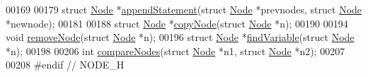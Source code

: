 \begin{DoxyCode}
00169 
00179 \textcolor{keyword}{struct }\hyperlink{structNode}{Node} *\hyperlink{node_8c_a36f4e62840cea8119a80005c7093c1a2}{appendStatement}(\textcolor{keyword}{struct} \hyperlink{structNode}{Node} *prevnodes, \textcolor{keyword}{struct} 
      \hyperlink{structNode}{Node} *newnode);
00181 
00188 \textcolor{keyword}{struct }\hyperlink{structNode}{Node} *\hyperlink{node_8c_a630e9a32f8dad634171441534eedd274}{copyNode}(\textcolor{keyword}{struct} \hyperlink{structNode}{Node} *n);
00190 
00194 \textcolor{keywordtype}{void} \hyperlink{node_8c_a9404ea17c515d0d18c37bde7c31b5979}{removeNode}(\textcolor{keyword}{struct} \hyperlink{structNode}{Node} *n);
00196 \textcolor{keyword}{struct }\hyperlink{structNode}{Node} *\hyperlink{node_8c_ab62128f06e9ecf1ba999035e44e20125}{findVariable}(\textcolor{keyword}{struct} \hyperlink{structNode}{Node} *n);
00198 
00206 \textcolor{keywordtype}{int} \hyperlink{node_8c_af424017909286f07f58ff8bcc1cb16ca}{compareNodes}(\textcolor{keyword}{struct} \hyperlink{structNode}{Node} *n1, \textcolor{keyword}{struct} \hyperlink{structNode}{Node} *n2);
00207 
00208 \textcolor{preprocessor}{#endif // NODE\_H}
\end{DoxyCode}

